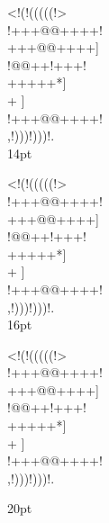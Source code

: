 \documentclass[10pt]{article}
\begin{document}
\begin{center}
\newpage
{
{
\gnos%
<!(!(((((!>\\
!+++@@++++!\\
+++@@++++]\\
!@@++!+++!\\
+++++*]\\
+
]\\
!+++@@++++!\\
,!)))!)))!.\\
}
}
14pt

{
\gnos%
<!(!(((((!>\\
!+++@@++++!\\
+++@@++++]\\
!@@++!+++!\\
+++++*]\\
+
]\\
!+++@@++++!\\
,!)))!)))!.\\
}
16pt

{
\gnos%
<!(!(((((!>\\
!+++@@++++!\\
+++@@++++]\\
!@@++!+++!\\
+++++*]\\
+
]\\
!+++@@++++!\\
,!)))!)))!.\\
\par
}
20pt

\newpage


\end{center}
\end{document}
